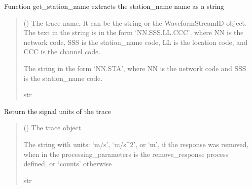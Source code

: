 \documentclass[letterpaper,10pt,english]{sphinxmanual}
\begin{document}

\begin{fulllineitems}
\label{\detokenize{api_core:core.utils.get_station_name}}
\pysigstartsignatures
{}
\pysigstopsignatures
\sphinxAtStartPar
Function get\_station\_name extracts the station\_name name as a string
\begin{quote}\begin{description}
\sphinxAtStartPar
{} () \textendash{} The trace name. It can be the string or the WaveformStreamID object.
The text in the string is in the form ‘NN.SSS.LL.CCC’, where NN is the network code,
SSS is the station\_name code, LL is the location code, and CCC is the channel code.

\sphinxAtStartPar
The string in the form ‘NN.STA’, where NN is the network code and SSS is the station\_name code.

\sphinxAtStartPar
str

\end{description}\end{quote}

\end{fulllineitems}


\begin{fulllineitems}
\label{\detokenize{api_core:core.utils.get_units}}
\pysigstartsignatures
{}
\pysigstopsignatures
\sphinxAtStartPar
Return the signal units of the trace
\begin{quote}\begin{description}
\sphinxAtStartPar
{} () \textendash{} The trace object

\sphinxAtStartPar
The string with units: ‘m/s’, ‘m/s\textasciicircum{}2’, or ‘m’, if the response was removed,
when in the processing\_parameters is the remove\_response process defined,
or ‘counts’ otherwise

\sphinxAtStartPar
str

\end{description}\end{quote}

\end{fulllineitems}
\end{document}
